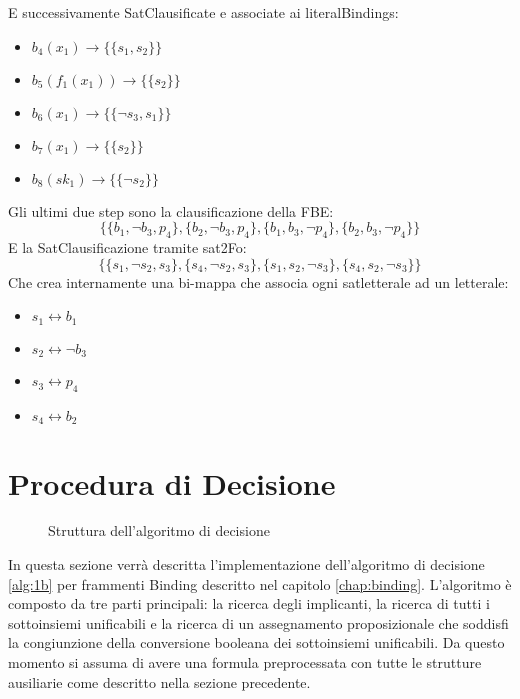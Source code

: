 \documentclass[./main.tex]{subfiles}
\begin{document}
E successivamente SatClausificate e associate ai literalBindings:
\begin{itemize}
    \item $b_4(x_1) \rightarrow \{\{s_1, s_2\}\}$
    \item $b_5(f_1(x_1)) \rightarrow \{\{s_2\}\}$
    \item $b_6(x_1) \rightarrow \{\{\lnot s_3, s_1\}\}$
    \item $b_7(x_1) \rightarrow \{\{s_2\}\}$
    \item $b_8(sk_1) \rightarrow \{\{\lnot s_2\}\}$
\end{itemize}

Gli ultimi due step sono la clausificazione della FBE:
$$ \{\{b_1, \lnot b_3, p_4\}, \{b_2, \lnot b_3, p_4\}, \{b_1, b_3, \lnot p_4\}, \{b_2,  b_3, \lnot p_4\}\} $$
E la SatClausificazione tramite sat2Fo:
$$ \{\{s_1, \lnot s_2, s_3\}, \{s_4, \lnot s_2, s_3\}, \{s_1, s_2, \lnot s_3\}, \{s_4,  s_2, \lnot s_3\}\} $$
Che crea internamente una bi-mappa che associa ogni satletterale ad un letterale:
\begin{multicols}{2}
\begin{itemize}
    \item $s_1 \leftrightarrow b_1$
    \item $s_2 \leftrightarrow \lnot b_3$
    \item $s_3 \leftrightarrow p_4$
    \item $s_4 \leftrightarrow b_2$
\end{itemize} 
\end{multicols}



\section{Procedura di Decisione}
\begin{figure}[H]
    \centering
    \scalebox{0.55}{
        
    }
    \caption{Struttura dell'algoritmo di decisione}
    \label{fig:algoritmo_decisione}
\end{figure}

In questa sezione verrà descritta l'implementazione dell'algoritmo di decisione \ref{alg:1b}
per frammenti Binding descritto nel capitolo \ref{chap:binding}.
L'algoritmo è composto da tre parti principali: la ricerca degli implicanti,
la ricerca di tutti i sottoinsiemi unificabili e la ricerca di un assegnamento proposizionale 
che soddisfi la congiunzione della conversione booleana dei sottoinsiemi unificabili.
Da questo momento si assuma di avere una formula preprocessata con tutte le strutture ausiliarie come descritto nella sezione precedente.
\end{document}
